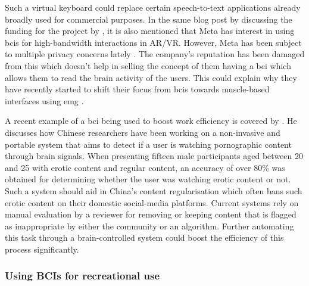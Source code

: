 Such a virtual keyboard could replace certain speech-to-text applications already broadly used for commercial purposes.
In the same blog post by \citet{facebook_bci_blog} discussing the funding for the project by \citet{facebook_bci_keyboard}, it is also mentioned that Meta has interest in using \glspl{bci} for high-bandwidth interactions in AR/VR.
However, Meta has been subject to multiple privacy concerns lately \citep{facebook_drama1, facebook_drama2}.
The company's reputation has been damaged from this which doesn't help in selling the concept of them having a \gls{bci} which allows them to read the brain activity of the users.
This could explain why they have recently started to shift their focus from \glspl{bci} towards muscle-based interfaces using \gls{emg} \citep{facebook_bci_blog}.

A recent example of a \gls{bci} being used to boost work efficiency is covered by \citet{bci_nude_detection}.
He discusses how Chinese researchers have been working on a non-invasive and portable system that aims to detect if a user is watching pornographic content through brain signals.
When presenting fifteen male participants aged between 20 and 25 with erotic content and regular content, an accuracy of over 80\% was obtained for determining whether the user was watching erotic content or not.
Such a system should aid in China's content regularisation which often bans such erotic content on their domestic social-media platforms.
Current systems rely on manual evaluation by a reviewer for removing or keeping content that is flagged as inappropriate by either the community or an algorithm. 
Further automating this task through a brain-controlled system could boost the efficiency of this process significantly.



\subsubsection{Using BCIs for recreational use}
\label{subsubsec:bci_gaining_popularity_big_tech_recreational}

